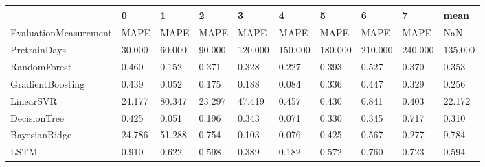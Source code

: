 \begin{tabular}{llllllllll}
\toprule
{} &      0 &      1 &      2 &       3 &       4 &       5 &       6 &       7 &    mean \\
\midrule
EvaluationMeasurement &   MAPE &   MAPE &   MAPE &    MAPE &    MAPE &    MAPE &    MAPE &    MAPE &     NaN \\
PretrainDays          & 30.000 & 60.000 & 90.000 & 120.000 & 150.000 & 180.000 & 210.000 & 240.000 & 135.000 \\
RandomForest          &  0.460 &  0.152 &  0.371 &   0.328 &   0.227 &   0.393 &   0.527 &   0.370 &   0.353 \\
GradientBoosting      &  0.439 &  0.052 &  0.175 &   0.188 &   0.084 &   0.336 &   0.447 &   0.329 &   0.256 \\
LinearSVR             & 24.177 & 80.347 & 23.297 &  47.419 &   0.457 &   0.430 &   0.841 &   0.403 &  22.172 \\
DecisionTree          &  0.425 &  0.051 &  0.196 &   0.343 &   0.071 &   0.330 &   0.345 &   0.717 &   0.310 \\
BayesianRidge         & 24.786 & 51.288 &  0.754 &   0.103 &   0.076 &   0.425 &   0.567 &   0.277 &   9.784 \\
LSTM                  &  0.910 &  0.622 &  0.598 &   0.389 &   0.182 &   0.572 &   0.760 &   0.723 &   0.594 \\
\bottomrule
\end{tabular}
